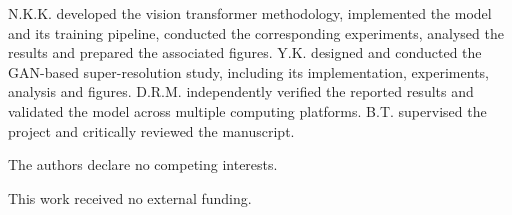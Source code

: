 \documentclass[pdflatex,sn-mathphys-num,twocolumn,lineno]{sn-jnl}
\theoremstyle{thmstyleone}%
\begin{document}
N.K.K. developed the vision transformer methodology, implemented the model and its training pipeline, conducted the corresponding experiments, analysed the results and prepared the associated figures. Y.K. designed and conducted the GAN-based super-resolution study, including its implementation, experiments, analysis and figures. D.R.M. independently verified the reported results and validated the model across multiple computing platforms. B.T. supervised the project and critically reviewed the manuscript.

The authors declare no competing interests.

This work received no external funding.




\end{document}
